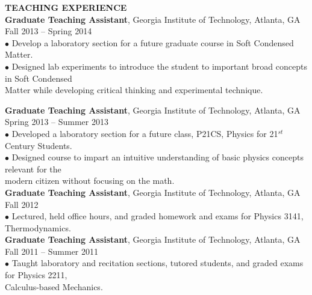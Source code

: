 \documentclass[10pt]{article}
\begin{document}


\textbf{\large TEACHING EXPERIENCE} \\
{\bf Graduate Teaching Assistant}, Georgia Institute of Technology, Atlanta, GA \hfill Fall 2013 -- Spring 2014\\
\hspace*{10pt}$\bullet$ Develop a laboratory section for a future graduate course in Soft Condensed Matter.  \\
\hspace*{10pt}$\bullet$ Designed lab experiments to introduce the student to important broad concepts in Soft Condensed \\ \hspace*{15pt} Matter while developing critical thinking and experimental technique.  \\

\newpage

{\bf Graduate Teaching Assistant}, Georgia Institute of Technology, Atlanta, GA \hfill Spring 2013 -- Summer 2013\\
\hspace*{10pt}$\bullet$ Developed a laboratory section for a future class, P21CS, Physics for 21$^{st}$ Century Students. \\
\hspace*{10pt}$\bullet$ Designed course to impart an intuitive understanding of basic physics concepts relevant for the \\ \hspace*{15pt} modern citizen without focusing on the math. \\

{\bf Graduate Teaching Assistant}, Georgia Institute of Technology, Atlanta, GA \hfill Fall 2012 \\
\hspace*{10pt}$\bullet$ Lectured, held office hours, and graded homework and exams for Physics 3141, Thermodynamics. \\


{\bf Graduate Teaching Assistant}, Georgia Institute of Technology, Atlanta, GA \hfill Fall 2011 -- Summer 2011\\
\hspace*{10pt}$\bullet$ Taught laboratory and recitation sections, tutored students, and graded exams for Physics 2211, \\ \hspace*{15pt} Calculus-based Mechanics. \\
\end{document}
